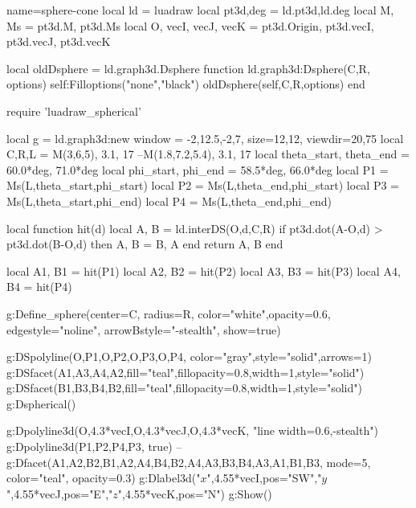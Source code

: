 \documentclass{standalone}
\begin{document}
\begin{luadraw}{name=sphere-cone}
local ld = luadraw
local pt3d,deg = ld.pt3d,ld.deg
local M, Ms = pt3d.M, pt3d.Ms
local O, vecI, vecJ, vecK = pt3d.Origin, pt3d.vecI, pt3d.vecJ, pt3d.vecK

local oldDsphere = ld.graph3d.Dsphere
function ld.graph3d:Dsphere(C,R, options)
    self:Filloptions("none","black")
    oldDsphere(self,C,R,options)
end

require 'luadraw_spherical'

local g = ld.graph3d:new{
    window = {-2,12.5,-2,7},
    size={12,12},
    viewdir={20,75}
}
local C,R,L = M(3,6,5), 3.1, 17 --M(1.8,7.2,5.4), 3.1, 17
local theta_start, theta_end = 60.0*deg, 71.0*deg
local phi_start, phi_end = 58.5*deg, 66.0*deg
local P1 = Ms(L,theta_start,phi_start)
local P2 = Ms(L,theta_end,phi_start)
local P3 = Ms(L,theta_start,phi_end)
local P4 = Ms(L,theta_end,phi_end)

local function hit(d)
    local A, B = ld.interDS({O,d},{C,R})
    if pt3d.dot(A-O,d) > pt3d.dot(B-O,d) then A, B = B, A end
    return A, B
end

local A1, B1 = hit(P1)
local A2, B2 = hit(P2)
local A3, B3 = hit(P3)
local A4, B4 = hit(P4)

g:Define_sphere({center=C, radius=R, color="white",opacity=0.6, 
    edgestyle="noline", arrowBstyle="-stealth", show=true})

g:DSpolyline({{O,P1},{O,P2},{O,P3},{O,P4}}, {color="gray",style="solid",arrows=1})
g:DSfacet({A1,A3,A4,A2},{fill="teal",fillopacity=0.8,width=1,style="solid"})
g:DSfacet({B1,B3,B4,B2},{fill="teal",fillopacity=0.8,width=1,style="solid"})
g:Dspherical()

g:Dpolyline3d({{O,4.3*vecI},{O,4.3*vecJ},{O,4.3*vecK}}, "line width=0.6,-stealth")
g:Dpolyline3d({P1,P2,P4,P3}, true)
--g:Dfacet({{A1,A2,B2,B1},{A2,A4,B4,B2},{A4,A3,B3,B4},{A3,A1,B1,B3}}, {mode=5, color="teal", opacity=0.3})
g:Dlabel3d("$x$",4.55*vecI,{pos="SW"},"$y$",4.55*vecJ,{pos="E"},"$z$",4.55*vecK,{pos="N"})
g:Show()
\end{luadraw}
\end{document}

